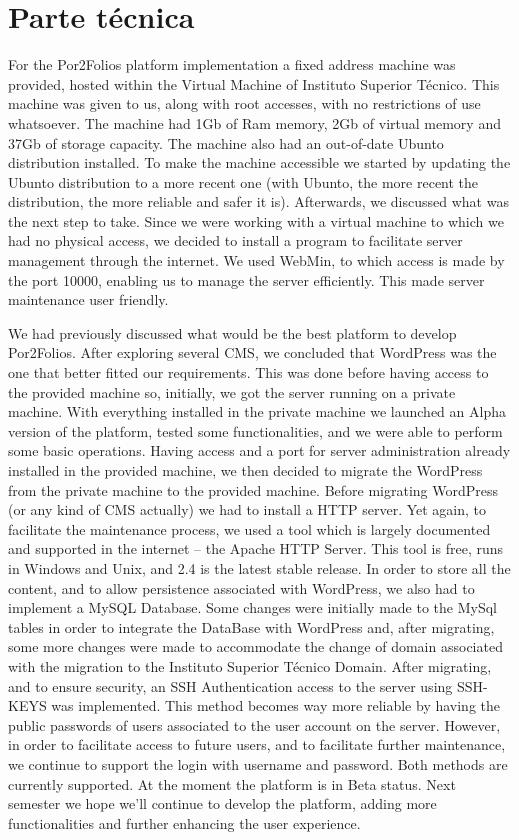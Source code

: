 \documentclass[a4paper,12pt,journal,twoside,compsoc]{PPIEEEtran}
\begin{document}
\section{Parte técnica}
For the Por2Folios platform implementation a fixed address machine was provided, hosted within the Virtual Machine of Instituto Superior Técnico. This machine was given to us, along with root accesses, with no restrictions of use whatsoever. The machine had 1Gb of Ram memory, 2Gb of virtual memory and 37Gb of storage capacity. The machine also had an out-of-date Ubunto distribution installed. To make the machine accessible we started by updating the Ubunto distribution to a more recent one (with Ubunto, the more recent the distribution, the more reliable and safer it is). Afterwards, we discussed what was the next step to take. Since we were working with a virtual machine to which we had no physical access, we decided to install a program to facilitate server management through the internet.  We used WebMin, to which access is made by the port 10000, enabling us to manage the server efficiently. This made server maintenance user friendly.

We had previously discussed what would be the best platform to develop Por2Folios. After exploring several \ac{CMS}, we concluded that WordPress was the one that better fitted our requirements. This was done before having access to the provided machine so, initially, we got the server running on a private machine. With everything installed in the private machine we launched an Alpha version of the platform, tested some functionalities, and we were able to perform some basic operations.
Having access and a port for server administration already installed in the provided machine, we then decided to migrate the WordPress from the private machine to the provided machine.
Before migrating WordPress (or any kind of \ac{CMS} actually) we had to install a HTTP server. Yet again, to facilitate the maintenance process, we used a tool which is largely documented and supported in the internet -- the Apache HTTP Server. This tool is free, runs in Windows and Unix, and 2.4 is the latest stable release. 
In order to store all the content, and to allow persistence associated with WordPress, we also had to implement a MySQL Database. Some changes were initially made to the MySql tables in order to integrate the DataBase with WordPress and, after migrating, some more changes were made to accommodate the change of domain associated with the migration to the Instituto Superior Técnico Domain.
After migrating, and to ensure security, an SSH Authentication access to the server using SSH-KEYS was implemented. This method becomes way more reliable by having the public passwords of users associated to the user account on the server. However, in order to facilitate access to future users, and to facilitate further maintenance, we continue to support the login with username and password. Both methods are currently supported.
At the moment the platform is in Beta status. Next semester we hope we'll continue to develop the platform, adding more functionalities and further enhancing the user experience.
\end{document}
